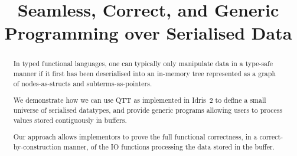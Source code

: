 \documentclass[10pt]{article}
\title{Seamless, Correct, and Generic \\ Programming over Serialised Data}
\author{\iftoggle{BLIND}{ANONYMOUS}{Guillaume Allais}}
\newcommand{\idris}{Idris~2}
\begin{document}
\maketitle

\begin{abstract}
In typed functional languages, one can typically only manipulate data
in a type-safe manner if it first has been deserialised into an in-memory
tree represented as a graph of nodes-as-structs and subterms-as-pointers.

We demonstrate how we can use QTT as implemented in \idris{} to define
a small universe of serialised datatypes, and provide generic programs
allowing users to process values stored contiguously in buffers.

Our approach allows implementors to prove the full functional correctness,
in a correct-by-construction manner, of the IO functions processing the
data stored in the buffer.
\end{abstract}


















\newpage


\newpage
\appendix


\end{document}
